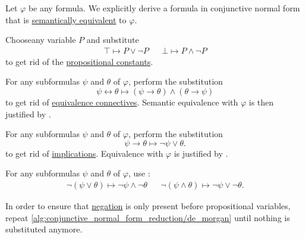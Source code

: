 \begin{algorithm}\label{alg:conjunctive_normal_form_reduction}
  Let \( \varphi \) be any formula. We explicitly derive a formula in conjunctive normal form that is \hyperref[def:propositional_interpretation/equivalence]{semantically equivalent} to \( \varphi \).

  \begin{AlgEnum}
     Choose\AOC any variable \( P \) and substitute
    \begin{align*}
      \top \mapsto P \vee \neg P && \bot \mapsto P \wedge \neg P
    \end{align*}
    to get rid of the \hyperref[def:propositional_alphabet/constants]{propositional constants}.

     For any subformulas \( \psi \) and \( \theta \) of \( \varphi \), perform the substitution
    \begin{equation*}
      \psi \leftrightarrow \theta \mapsto (\psi \rightarrow \theta) \wedge (\theta \rightarrow \psi)
    \end{equation*}
    to get rid of \hyperref[def:propositional_alphabet/connectives/equivalence]{equivalence connectives}. Semantic equivalence with \( \varphi \) is then justified by .

     For any subformulas \( \psi \) and \( \theta \) of \( \varphi \), perform the substitution
    \begin{equation*}
      \psi \rightarrow \theta \mapsto \neg \psi \vee \theta.
    \end{equation*}
    to get rid of \hyperref[def:propositional_alphabet/connectives/implication]{implications}. Equivalence with \( \varphi \) is justified by .

     For any subformulas \( \psi \) and \( \theta \) of \( \varphi \), use :
    \begin{align*}
      \neg(\psi \vee \theta) \mapsto \neg \psi \wedge \neg \theta
      &&
      \neg(\psi \wedge \theta) \mapsto \neg \psi \vee \neg \theta.
    \end{align*}

    In order to ensure that \hyperref[def:propositional_alphabet/negation]{negation} is only present before propositional variables, repeat \ref{alg:conjunctive_normal_form_reduction/de_morgan} until nothing is substituted anymore.


\end{AlgEnum}
\end{algorithm}
